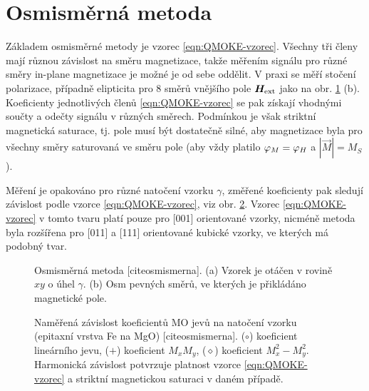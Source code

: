 \section{Osmisměrná metoda}
\label{chap:osmismerna-metoda}

Základem osmisměrné metody\cite{osmismerna} je vzorec \eqref{eqn:QMOKE-vzorec}.
Všechny tři členy mají různou závislost na směru magnetizace, takže měřením signálu pro různé směry in-plane magnetizace je možné je od sebe oddělit.
V praxi se měří stočení polarizace, případně elipticita pro 8 směrů vnějšího pole $\bm{H}_\textrm{ext}$ jako na obr. \ref{fig:osmismerna-metoda} (b).
Koeficienty jednotlivých členů \eqref{eqn:QMOKE-vzorec} se pak získají vhodnými součty a odečty signálu v různých směrech.
Podmínkou je však striktní magnetická saturace, tj. pole musí být dostatečně silné, aby magnetizace byla pro všechny směry saturovaná ve směru pole (aby vždy platilo $\varphi_M=\varphi_H$ a $|\vec{M}|=M_S$).

Měření je opakováno pro různé natočení vzorku $\gamma$, změřené koeficienty pak sledují závislost podle vzorce \eqref{eqn:QMOKE-vzorec}, viz obr. \ref{fig:osmismerna-vysledky}.
Vzorec \eqref{eqn:QMOKE-vzorec} v tomto tvaru platí pouze pro [001] orientované vzorky, nicméně metoda byla rozšířena pro [011] a [111] orientované kubické vzorky, ve kterých má podobný tvar.

\begin{figure}[htbp]
    \centering
    \caption{Osmisměrná metoda [cite{osmismerna}]. (a) Vzorek je otáčen v rovině $xy$ o úhel $\gamma$. (b) Osm pevných směrů, ve kterých je přikládáno magnetické pole.}
    \label{fig:osmismerna-metoda}
\end{figure}

\begin{figure}[htbp]
    \centering
    \caption{Naměřená závislost koeficientů MO jevů na natočení vzorku (epitaxní vrstva Fe na MgO) [cite{osmismerna}]. ($\circ$) koeficient lineárního jevu, ($+$) koeficient $M_xM_y$, ($\diamond$) koeficient $M_x^2-M_y^2$. Harmonická závislost potvrzuje platnost vzorce \eqref{eqn:QMOKE-vzorec} a striktní magnetickou saturaci v daném případě.}
    \label{fig:osmismerna-vysledky}
\end{figure}
